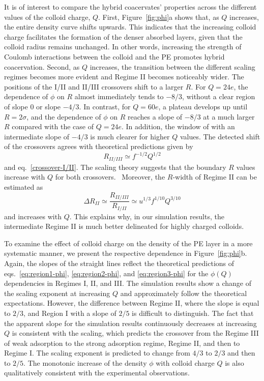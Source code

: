 \documentclass[journal=mamobx, manuscript=article]{achemso}
\begin{document}
It is of interest to compare the hybrid coacervates' properties across the different values of the colloid charge, $Q$. First, Figure~\ref{fig:phi}a shows that, as $Q$ increases, the entire density curve shifts upwards. This indicates that the increasing colloid charge facilitates the formation of the denser absorbed layers, given that the colloid radius remains unchanged. In other words, increasing the strength of Coulomb interactions between the colloid and the PE promotes hybrid coacervation. Second, as $Q$ increases, the transition between the different scaling regimes becomes more evident and Regime II becomes noticeably wider. The positions of the I/II and II/III crossovers shift to a larger $R$. For $Q = 24e$, the dependence of $\phi$ on $R$ almost immediately tends to $-8/3$, without a clear region of slope $0$ or slope $-4/3$. In contrast, for $Q = 60e$, a plateau develops up until $R = 2\sigma$, and the dependence of $\phi$ on $R$ reaches a slope of $-8/3$ at a much larger $R$ compared with the case of $Q = 24e$. In addition, the window of with an intermediate slope of $-4/3$ is much clearer for higher $Q$ values. The detected shift of the crossovers agrees with theoretical predictions given by
\begin{equation}
R_{II/III} \simeq f^{-1/2} Q^{1/2}
\label{crossover-II/III}
\end{equation}
and eq.~\ref{crossover-I/II}. The scaling theory suggests that the boundary $R$ values increase with $Q$ for both crossovers.~\cite{artem2022hybrid} Moreover, the $R$-width of Regime II can be estimated as
\begin{equation}
\Delta R_{II} \simeq \frac{R_{II/III}} {R_{I/II}} \simeq u^{1/3} f^{1/10} Q^{3/10}
\end{equation}
and increases with $Q$. This explains why, in our simulation results, the intermediate Regime II is much better delineated for highly charged colloids. 

To examine the effect of colloid charge on the density of the PE layer in a more systematic manner, we present the respective dependence in Figure~\ref{fig:phi}b. Again, the slopes of the straight lines reflect the theoretical predictions of eqs.~\ref{eq:region1-phi}, \ref{eq:region2-phi}, and \ref{eq:region3-phi} for the $\phi(Q)$ dependencies in Regimes I, II, and III. The simulation results show a change of the scaling exponent at increasing $Q$ and approximately follow the theoretical expectations. However, the difference between Regime II, where the slope is equal to $2/3$, and Region I with a slope of $2/5$ is difficult to distinguish. The fact that the apparent slope for the simulation results continuously decreases at increasing $Q$ is consistent with the scaling, which predicts the crossover from the Regime III of weak adsorption to the strong adsorption regime, Regime II, and then to Regime I. The scaling exponent is predicted to change from $4/3$ to $2/3$ and then to $2/5$. The monotonic increase of the density $\phi$ with colloid charge $Q$ is also qualitatively consistent with the experimental observations.~\cite{cummings2018phase}
\end{document}

